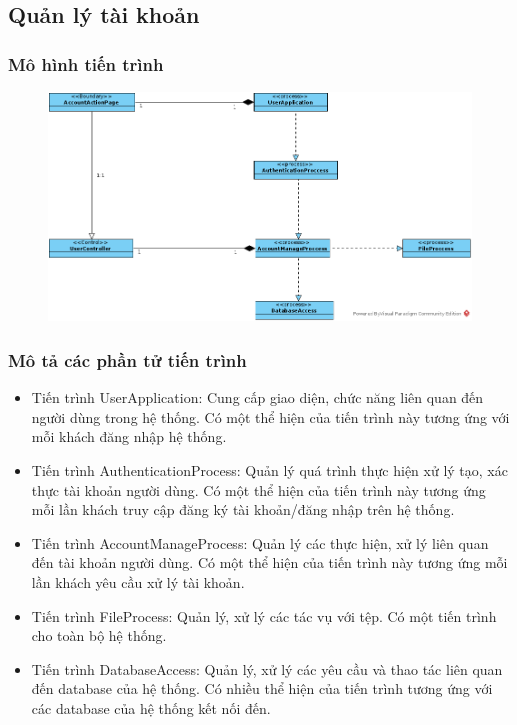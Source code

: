 \documentclass[./../main.tex]{subfiles}
\begin{document}
\subsection{Quản lý tài khoản}

\subsubsection{Mô hình tiến trình}

\begin{figure}[H]
	\centering
	\includegraphics[width=\linewidth]{./images/pv_account_manage.png}
\end{figure}

\subsubsection{Mô tả các phần tử tiến trình}
\begin{itemize}
	\item Tiến trình UserApplication: Cung cấp giao diện, chức năng liên quan đến người dùng trong hệ thống. Có một thể hiện của tiến trình này tương ứng với mỗi khách đăng nhập hệ thống.
	\item Tiến trình AuthenticationProcess: Quản lý quá trình thực hiện xử lý tạo, xác thực tài khoản người dùng.
	Có một thể hiện của tiến trình này tương ứng mỗi lần khách truy cập đăng ký tài khoản/đăng nhập trên hệ thống.
\item Tiến trình AccountManageProcess: Quản lý các thực hiện, xử lý liên quan đến tài khoản người dùng.
	Có một thể hiện của tiến trình này tương ứng mỗi lần khách yêu cầu xử lý tài khoản.
	\item Tiến trình FileProcess: Quản lý, xử lý các tác vụ với tệp.
	Có một tiến trình cho toàn bộ hệ thống.
	\item Tiến trình DatabaseAccess: Quản lý, xử lý các yêu cầu và thao tác liên quan đến database của hệ thống. Có nhiều thể hiện của tiến trình tương ứng với các database của hệ thống kết nối đến.
\end{itemize}
\end{document}
